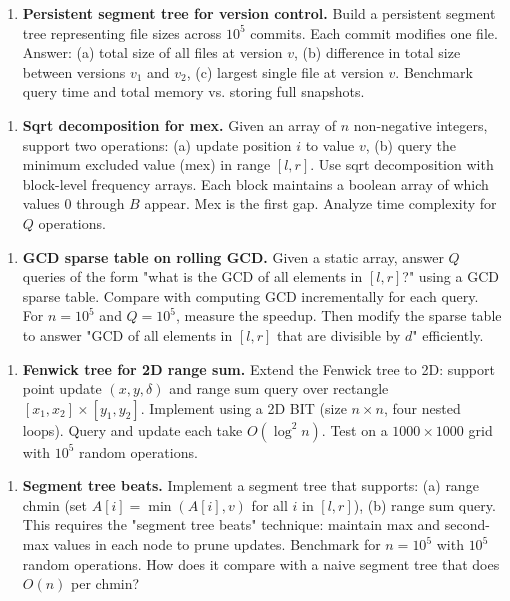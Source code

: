 \begin{enumerate}
\item \textbf{Persistent segment tree for version control.} Build a persistent segment tree representing file sizes across $10^{5}$ commits. Each commit modifies one file. Answer: (a) total size of all files at version $v$, (b) difference in total size between versions $v_1$ and $v_2$, (c) largest single file at version $v$. Benchmark query time and total memory vs. storing full snapshots.
\end{enumerate}

\begin{enumerate}
\item \textbf{Sqrt decomposition for mex.} Given an array of $n$ non-negative integers, support two operations: (a) update position $i$ to value $v$, (b) query the minimum excluded value (mex) in range $[l, r]$. Use sqrt decomposition with block-level frequency arrays. Each block maintains a boolean array of which values 0 through $B$ appear. Mex is the first gap. Analyze time complexity for $Q$ operations.
\end{enumerate}

\begin{enumerate}
\item \textbf{GCD sparse table on rolling GCD.} Given a static array, answer $Q$ queries of the form "what is the GCD of all elements in $[l, r]$?" using a GCD sparse table. Compare with computing GCD incrementally for each query. For $n = 10^{5}$ and $Q = 10^{5}$, measure the speedup. Then modify the sparse table to answer "GCD of all elements in $[l, r]$ that are divisible by $d$" efficiently.
\end{enumerate}

\begin{enumerate}
\item \textbf{Fenwick tree for 2D range sum.} Extend the Fenwick tree to 2D: support point update $(x, y, \delta)$ and range sum query over rectangle $[x_1, x_2] \times [y_1, y_2]$. Implement using a 2D BIT (size $n \times n$, four nested loops). Query and update each take $O(\log^2 n)$. Test on a $1000 \times 1000$ grid with $10^{5}$ random operations.
\end{enumerate}

\begin{enumerate}
\item \textbf{Segment tree beats.} Implement a segment tree that supports: (a) range chmin (set $A[i] = \min(A[i], v)$ for all $i$ in $[l, r]$), (b) range sum query. This requires the "segment tree beats" technique: maintain max and second-max values in each node to prune updates. Benchmark for $n = 10^{5}$ with $10^{5}$ random operations. How does it compare with a naive segment tree that does $O(n)$ per chmin?
\end{enumerate}

